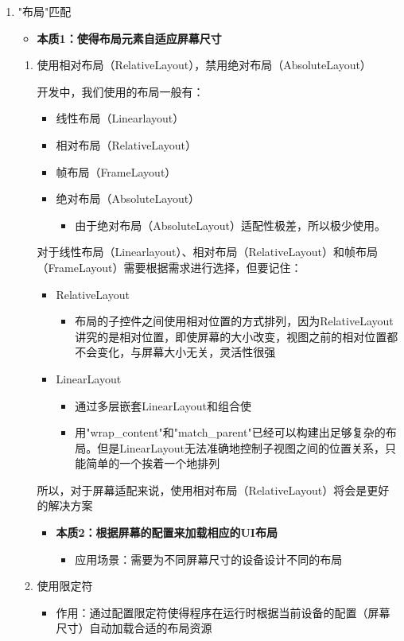 \documentclass[9pt, b5paper]{article}
\begin{document}
\begin{enumerate}
\item "布局"匹配
\label{sec-1-6-1-1}
\begin{itemize}
\item \textbf{本质1：使得布局元素自适应屏幕尺寸}
\end{itemize}
\begin{enumerate}
\item 使用相对布局（RelativeLayout），禁用绝对布局（AbsoluteLayout）
\label{sec-1-6-1-1-1}

开发中，我们使用的布局一般有：
\begin{itemize}
\item 线性布局（Linearlayout）
\item 相对布局（RelativeLayout）
\item 帧布局（FrameLayout）
\item 绝对布局（AbsoluteLayout）
\begin{itemize}
\item 由于绝对布局（AbsoluteLayout）适配性极差，所以极少使用。
\end{itemize}
\end{itemize}

对于线性布局（Linearlayout）、相对布局（RelativeLayout）和帧布局（FrameLayout）需要根据需求进行选择，但要记住：
\begin{itemize}
\item RelativeLayout
\begin{itemize}
\item 布局的子控件之间使用相对位置的方式排列，因为RelativeLayout讲究的是相对位置，即使屏幕的大小改变，视图之前的相对位置都不会变化，与屏幕大小无关，灵活性很强
\end{itemize}
\item LinearLayout
\begin{itemize}
\item 通过多层嵌套LinearLayout和组合使
\item 用"wrap\_content"和"match\_parent"已经可以构建出足够复杂的布局。但是LinearLayout无法准确地控制子视图之间的位置关系，只能简单的一个挨着一个地排列
\end{itemize}
\end{itemize}

所以，对于屏幕适配来说，使用相对布局（RelativeLayout）将会是更好的解决方案

\begin{itemize}
\item \textbf{本质2：根据屏幕的配置来加载相应的UI布局}
\begin{itemize}
\item 应用场景：需要为不同屏幕尺寸的设备设计不同的布局
\end{itemize}
\end{itemize}
\item 使用限定符
\label{sec-1-6-1-1-2}
\begin{itemize}
\item 作用：通过配置限定符使得程序在运行时根据当前设备的配置（屏幕尺寸）自动加载合适的布局资源
\end{itemize}


\end{enumerate}
\end{enumerate}
\end{document}
